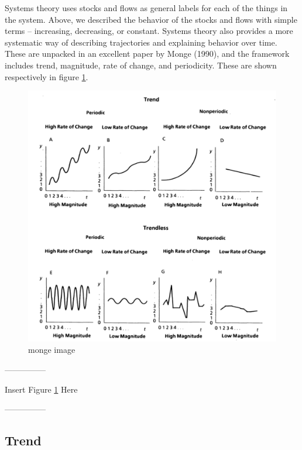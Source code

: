 \documentclass[english,,man]{apa6}
\theoremstyle{definition}
\theoremstyle{definition}
\theoremstyle{definition}
\theoremstyle{remark}
\begin{document}
Systems theory uses stocks and flows as general labels for each of the
things in the system. Above, we described the behavior of the stocks and
flows with simple terms -- increasing, decreasing, or constant. Systems
theory also provides a more systematic way of describing trajectories
and explaining behavior over time. These are unpacked in an excellent
paper by Monge (1990), and the framework includes trend, magnitude, rate
of change, and periodicity. These are shown respectively in figure
\ref{monge}.

\begin{figure}
\centering
\includegraphics{figs/unnamed-chunk-6-1.pdf}
\caption{\label{fig:unnamed-chunk-6}monge image\label{monge}}
\end{figure}

\begin{center}

---------------

Insert Figure \ref{monge} Here

---------------

\end{center}

\hypertarget{trend}{%
\subsection{Trend}\label{trend}}
\end{document}
